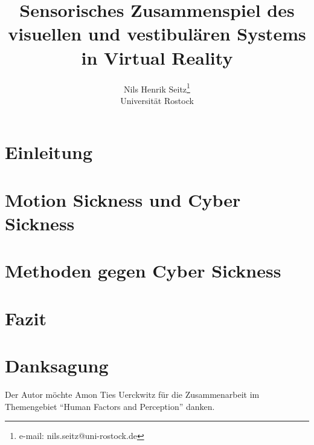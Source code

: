 \documentclass[preprint]{vgtc}               %
\title{Sensorisches Zusammenspiel des visuellen und vestibul\"aren Systems in Virtual Reality}
\author{Nils Henrik Seitz\thanks{e-mail: nils.seitz@uni-rostock.de}\\ \scriptsize Universit\"at Rostock}
\begin{document}
\maketitle
\section{Einleitung} 
	
	
\section{Motion Sickness und Cyber Sickness}
	
	
\section{Methoden gegen Cyber Sickness}\label{Maßnahmen gegen CS}
	

\section{Fazit}
	

\section*{Danksagung}{
	Der Autor m\"ochte Amon Ties Uerckwitz f\"ur die Zusammenarbeit im Themengebiet "`Human Factors and Perception"' danken.}

\newpage



\end{document}
